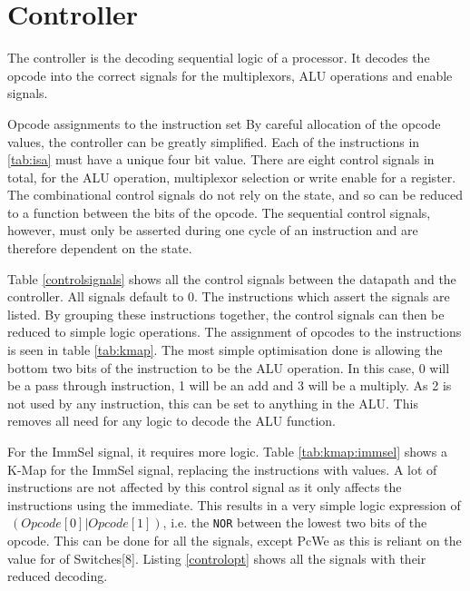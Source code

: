 

\section{Controller}\label{sect:controller}

The controller is the decoding sequential logic of a processor. 
It decodes the opcode into the correct signals for the multiplexors, ALU operations and enable signals.


Opcode assignments to the instruction set
By careful allocation of the opcode values, the controller can be greatly simplified. 
Each of the instructions in \ref{tab:isa} must have a unique four bit value. 
There are eight control signals in total, for the ALU operation, multiplexor selection or write enable for a register. 
The combinational control signals do not rely on the state, and so can be reduced to a function between the bits of the opcode. 
The sequential control signals, however, must only be asserted during one cycle of an instruction and are therefore dependent on the state. 

Table \ref{controlsignals} shows all the control signals between the datapath and the controller. 
All signals default to 0.
The instructions which assert the signals are listed. 
By grouping these instructions together, the control signals can then be reduced to simple logic operations.
The assignment of opcodes to the instructions is seen in table \ref{tab:kmap}. 
The most simple optimisation done is allowing the bottom two bits of the instruction to be the ALU operation. 
In this case, 0 will be a pass through instruction, 1 will be an add and 3 will be a multiply. 
As 2 is not used by any instruction, this can be set to anything in the ALU.
This removes all need for any logic to decode the ALU function. 

For the ImmSel signal, it requires more logic. 
Table \ref{tab:kmap:immsel} shows a K-Map for the ImmSel signal, replacing the instructions with values.
A lot of instructions are not affected by this control signal as it only affects the instructions using the immediate. 
This results in a very simple logic expression of $~(Opcode[0] | Opcode[1])$, i.e. the \texttt{NOR} between the lowest two bits of the opcode. 
This can be done for all the signals, except PcWe as this is reliant on the value for of Switches[8]. 
Listing \ref{controlopt} shows all the signals with their reduced decoding. 

